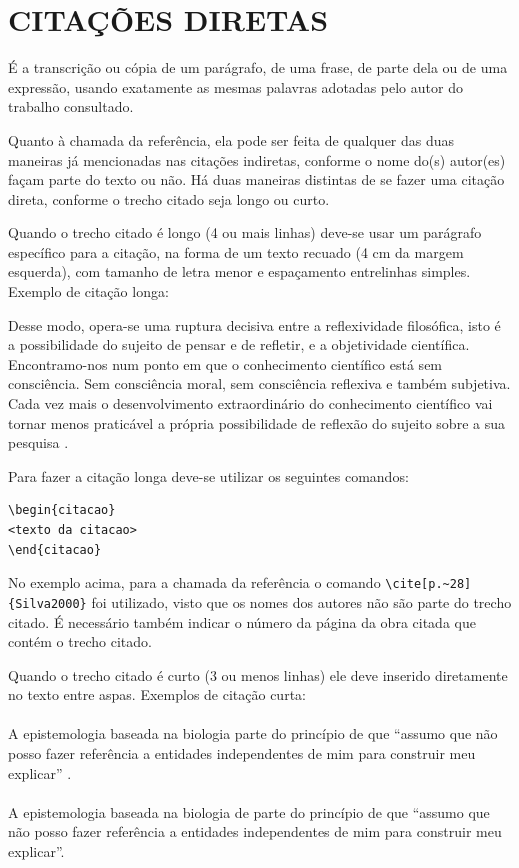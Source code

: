 \chapter{CITAÇÕES DIRETAS}
\label{chap:citacoesLiterais}

É a transcrição ou cópia de um parágrafo, de uma frase, de parte dela ou de uma expressão, usando exatamente as mesmas palavras adotadas pelo autor do trabalho consultado.

Quanto à chamada da referência, ela pode ser feita de qualquer das duas maneiras já mencionadas nas citações indiretas, conforme o nome do(s) autor(es) façam parte do texto ou não. Há duas maneiras distintas de se fazer uma citação direta, conforme o trecho citado seja longo ou curto.

Quando o trecho citado é longo (4 ou mais linhas) deve-se usar um parágrafo específico para a citação, na forma de um texto recuado (4 cm da margem esquerda), com tamanho de letra menor e espaçamento entrelinhas simples. Exemplo de citação longa:
\\\begin{citacao}
    Desse modo, opera-se uma ruptura decisiva entre a reflexividade filosófica, isto é a possibilidade do sujeito de pensar e de refletir, e a objetividade científica. Encontramo-nos num ponto em que o conhecimento científico está sem consciência. Sem consciência moral, sem consciência reflexiva e também subjetiva. Cada vez mais o desenvolvimento extraordinário do conhecimento científico vai tornar menos praticável a própria possibilidade de reflexão do sujeito sobre a sua pesquisa \cite[p.~28]{Silva2000}.
\end{citacao}

Para fazer a citação longa deve-se utilizar os seguintes comandos:
\begin{verbatim}
\begin{citacao}
<texto da citacao>
\end{citacao}
\end{verbatim}

No exemplo acima, para a chamada da referência o comando \verb|\cite[p.~28]{Silva2000}| foi utilizado, visto que os nomes dos autores não são parte do trecho citado. É necessário também indicar o número da página da obra citada que contém o trecho citado.

Quando o trecho citado é curto (3 ou menos linhas) ele deve inserido diretamente no texto entre aspas. Exemplos de citação curta:\\
\\A epistemologia baseada na biologia parte do princípio de que ``assumo que não posso fazer referência a entidades independentes de mim para construir meu explicar'' \cite[p.~35]{Maturana2003}.\\
\\A epistemologia baseada na biologia de \textcite[p.~35]{Maturana2003} parte do princípio de que ``assumo que não posso fazer referência a entidades independentes de mim para construir meu explicar''.


